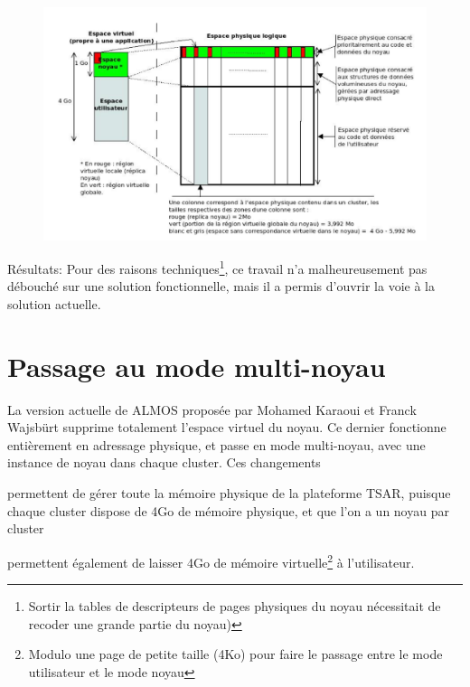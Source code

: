       \begin{figure}[!h]
        \centering
        \includegraphics[scale=0.3]{include/img/almos-guerret}
        \caption{}
        \label{almos-guerret}
      \end{figure}
      
      \begin{paragraph}{Résultats:}
        Pour des raisons techniques\footnote{Sortir la tables de descripteurs de
          pages physiques du noyau nécessitait de recoder une grande partie du
          noyau)}, ce travail n'a malheureusement pas débouché sur une solution
        fonctionnelle, mais il a permis d'ouvrir la voie à la solution actuelle.
      \end{paragraph}

      
  \section{Passage au mode multi-noyau}
      
    La version actuelle de ALMOS proposée par Mohamed Karaoui et Franck Wajsbürt
    supprime totalement l'espace virtuel du noyau. Ce dernier fonctionne
    entièrement en adressage physique, et passe en mode multi-noyau, avec une
    instance de noyau dans chaque cluster. Ces changements \benumline \item
    permettent de gérer toute la mémoire physique de la plateforme TSAR, puisque
    chaque cluster dispose de 4Go de mémoire physique, et que l'on a un noyau
    par cluster \item permettent également de laisser 4Go de mémoire
    virtuelle\footnote{Modulo une page de petite taille (4Ko) pour faire le
      passage entre le mode utilisateur et le mode noyau} à
    l'utilisateur\eenumline.


